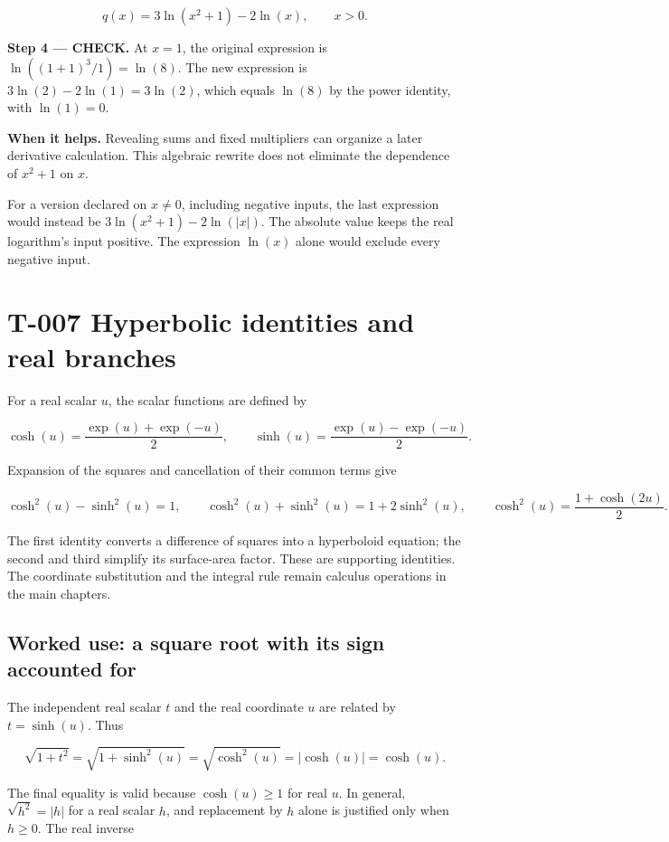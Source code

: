 \documentclass[11pt,oneside,openany]{book}
\begin{document}
\[
q(x)=3\ln(x^2+1)-2\ln(x),\qquad x>0.
\]

\endgroup
\textbf{Step 4 --- CHECK.} At \(x=1\), the original expression is
\(\ln((1+1)^3/1)=\ln(8)\). The new expression is \(3\ln(2)-2\ln(1)=3\ln(2)\),
which equals \(\ln(8)\) by the power identity, with \(\ln(1)=0\).

\textbf{When it helps.} Revealing sums and fixed multipliers can organize a later
derivative calculation. This algebraic rewrite does not eliminate the dependence
of \(x^2+1\) on \(x\).

For a version declared on \(x\ne0\), including negative inputs, the last expression
would instead be \(3\ln(x^2+1)-2\ln(|x|)\). The absolute value keeps the real
logarithm's input positive. The expression \(\ln(x)\) alone would exclude every
negative input.

\section{T-007 Hyperbolic identities and real branches}

For a real scalar \(u\), the scalar functions are defined by

\[
\cosh(u)=\frac{\exp(u)+\exp(-u)}{2},\qquad
\sinh(u)=\frac{\exp(u)-\exp(-u)}{2}.
\]

Expansion of the squares and cancellation of their common terms give

\[
\cosh^2(u)-\sinh^2(u)=1,\qquad
\cosh^2(u)+\sinh^2(u)=1+2\sinh^2(u),\qquad
\cosh^2(u)=\frac{1+\cosh(2u)}{2}.
\]

The first identity converts a difference of squares into a hyperboloid equation;
the second and third simplify its surface-area factor. These are supporting
identities. The coordinate substitution and the integral rule remain calculus
operations in the main chapters.

\subsection{Worked use: a square root with its sign accounted for}

The independent real scalar \(t\) and the real coordinate \(u\) are related by
\(t=\sinh(u)\). Thus

\[
\sqrt{1+t^2}=\sqrt{1+\sinh^2(u)}
=\sqrt{\cosh^2(u)}=|\cosh(u)|=\cosh(u).
\]

The final equality is valid because \(\cosh(u)\ge1\) for real \(u\). In general,
\(\sqrt{h^2}=|h|\) for a real scalar \(h\), and replacement by \(h\) alone is justified
only when \(h\ge0\). The real inverse
\end{document}
